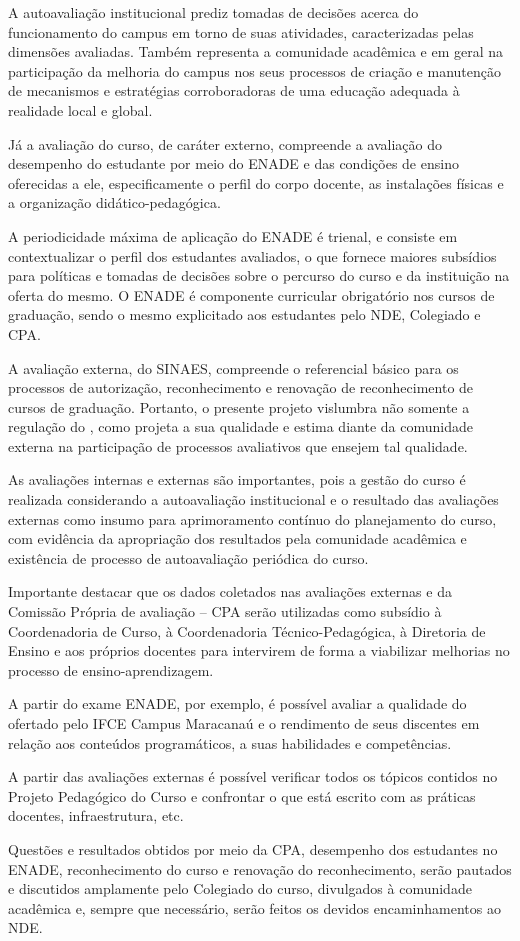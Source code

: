 A autoavaliação institucional prediz tomadas de decisões acerca do funcionamento do campus em torno de suas atividades, caracterizadas pelas dimensões avaliadas. Também representa a comunidade acadêmica e em geral na participação da melhoria do campus nos seus processos de criação e manutenção de mecanismos e estratégias corroboradoras de uma educação adequada à realidade local e global. 

Já a avaliação do curso, de caráter externo, compreende a avaliação do desempenho do estudante por meio do ENADE e das condições de ensino oferecidas a ele, especificamente o perfil do corpo docente, as instalações físicas e a organização didático-pedagógica. 

A periodicidade máxima de aplicação do ENADE é trienal, e consiste em contextualizar o perfil dos estudantes avaliados, o que fornece maiores subsídios para políticas e tomadas de decisões sobre o percurso do curso e da instituição na oferta do mesmo. O ENADE é componente curricular obrigatório nos cursos de graduação, sendo o mesmo explicitado aos estudantes pelo NDE, Colegiado e CPA. 

A avaliação externa, do SINAES, compreende o referencial básico para os processos de autorização, reconhecimento e renovação de reconhecimento de cursos de graduação. Portanto, o presente projeto vislumbra não somente a regulação do \NOMECURSO, como projeta a sua qualidade e estima diante da comunidade externa na participação de processos avaliativos que ensejem tal qualidade.

As avaliações internas e externas são importantes, pois a gestão do curso é realizada considerando a autoavaliação institucional e o resultado das avaliações externas como insumo para aprimoramento contínuo do planejamento do curso, com evidência da apropriação dos resultados pela comunidade acadêmica e existência de processo de autoavaliação periódica do curso.

Importante destacar que os dados coletados nas avaliações externas e da Comissão Própria de avaliação – CPA serão utilizadas como subsídio à Coordenadoria de Curso, à Coordenadoria Técnico-Pedagógica, à Diretoria de Ensino e aos próprios docentes para intervirem de forma a viabilizar melhorias no processo de ensino-aprendizagem. 

A partir do exame ENADE, por exemplo, é possível avaliar a qualidade do \NOMECURSO ofertado pelo IFCE Campus Maracanaú e o rendimento de seus discentes em relação aos conteúdos programáticos, a suas habilidades e competências. 

A partir das avaliações externas é possível verificar todos os tópicos contidos no Projeto Pedagógico do Curso e confrontar o que está escrito com as práticas docentes, infraestrutura, etc. 

Questões e resultados obtidos por meio da CPA, desempenho dos estudantes no ENADE, reconhecimento do curso e renovação do reconhecimento, serão pautados e discutidos amplamente pelo Colegiado do curso, divulgados à comunidade acadêmica e, sempre que necessário, serão feitos os devidos encaminhamentos ao NDE. 
